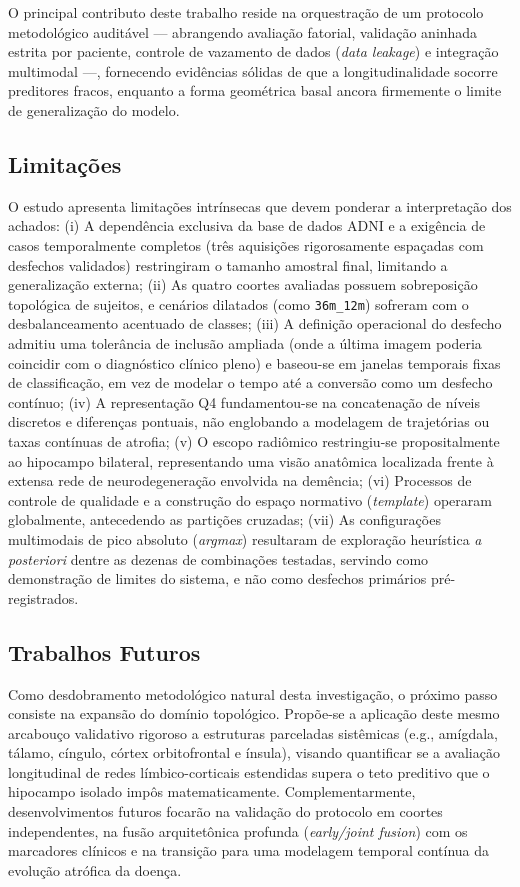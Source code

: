 \documentclass[review]{elsarticle}
\newcommand{\code}[1]{\texttt{#1}}
\begin{document}
	O principal contributo deste trabalho reside na orquestração de um protocolo metodológico auditável --- abrangendo avaliação fatorial, validação aninhada estrita por paciente, controle de vazamento de dados (\emph{data leakage}) e integração multimodal ---, fornecendo evidências sólidas de que a longitudinalidade socorre preditores fracos, enquanto a forma geométrica basal ancora firmemente o limite de generalização do modelo.
	
	\subsection{Limitações}
	O estudo apresenta limitações intrínsecas que devem ponderar a interpretação dos achados:
	(i) A dependência exclusiva da base de dados ADNI e a exigência de casos temporalmente completos (três aquisições rigorosamente espaçadas com desfechos validados) restringiram o tamanho amostral final, limitando a generalização externa; 
	(ii) As quatro coortes avaliadas possuem sobreposição topológica de sujeitos, e cenários dilatados (como \code{36m\_12m}) sofreram com o desbalanceamento acentuado de classes; 
	(iii) A definição operacional do desfecho admitiu uma tolerância de inclusão ampliada (onde a última imagem poderia coincidir com o diagnóstico clínico pleno) e baseou-se em janelas temporais fixas de classificação, em vez de modelar o tempo até a conversão como um desfecho contínuo; 
	(iv) A representação Q4 fundamentou-se na concatenação de níveis discretos e diferenças pontuais, não englobando a modelagem de trajetórias ou taxas contínuas de atrofia; 
	(v) O escopo radiômico restringiu-se propositalmente ao hipocampo bilateral, representando uma visão anatômica localizada frente à extensa rede de neurodegeneração envolvida na demência; 
	(vi) Processos de controle de qualidade e a construção do espaço normativo (\emph{template}) operaram globalmente, antecedendo as partições cruzadas; 
	(vii) As configurações multimodais de pico absoluto (\emph{argmax}) resultaram de exploração heurística \emph{a posteriori} dentre as dezenas de combinações testadas, servindo como demonstração de limites do sistema, e não como desfechos primários pré-registrados.
	
	\subsection{Trabalhos Futuros}
	Como desdobramento metodológico natural desta investigação, o próximo passo consiste na expansão do domínio topológico. Propõe-se a aplicação deste mesmo arcabouço validativo rigoroso a estruturas parceladas sistêmicas (e.g., amígdala, tálamo, cíngulo, córtex orbitofrontal e ínsula), visando quantificar se a avaliação longitudinal de redes límbico-corticais estendidas supera o teto preditivo que o hipocampo isolado impôs matematicamente. Complementarmente, desenvolvimentos futuros focarão na validação do protocolo em coortes independentes, na fusão arquitetônica profunda (\emph{early/joint fusion}) com os marcadores clínicos e na transição para uma modelagem temporal contínua da evolução atrófica da doença.
	
\end{document}

